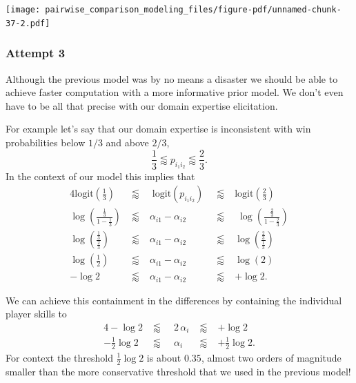 \documentclass[
  letterpaper,
  DIV=11,
  numbers=noendperiod]{scrartcl}
\begin{document}
\texttt{[image: pairwise\_comparison\_modeling\_files/figure-pdf/unnamed-chunk-37-2.pdf]}

\subsubsection{Attempt 3}\label{attempt-3}

Although the previous model was by no means a disaster we should be able
to achieve faster computation with a more informative prior model. We
don't even have to be all that precise with our domain expertise
elicitation.

For example let's say that our domain expertise is inconsistent with win
probabilities below \(1/3\) and above \(2/3\), \[
\frac{1}{3} \lessapprox p_{i_{1} i_{2}} \lessapprox \frac{2}{3}.
\] In the context of our model this implies that \begin{alignat*}{4}
\mathrm{logit} \left( \frac{1}{3} \right)
&\; \lessapprox \;&
\; \mathrm{logit} ( p_{i_{1} i_{2}} ) \;
&\; \lessapprox \;&
\mathrm{logit} \left( \frac{2}{3} \right)
\\
\log \left( \frac{ \frac{1}{3} }{1 - \frac{1}{3}} \right)
&\; \lessapprox \;&
\alpha_{i1} - \alpha_{i2}
&\; \lessapprox \;&
\; \log \left( \frac{ \frac{2}{3} }{1 - \frac{2}{3}} \right)
\\
\log \left( \frac{ \frac{1}{3} }{\frac{2}{3}} \right)
&\; \lessapprox \;&
\alpha_{i1} - \alpha_{i2}
&\; \lessapprox \;&
\log \left( \frac{ \frac{2}{3} }{\frac{1}{3}} \right)
\\
\log \left( \frac{1}{2} \right)
&\; \lessapprox \;&
\alpha_{i1} - \alpha_{i2}
&\; \lessapprox \;&
\log \left( 2 \right)
\\
- \log 2
&\; \lessapprox \;&
\alpha_{i1} - \alpha_{i2}
&\; \lessapprox \;&
+ \log 2.
\end{alignat*}

We can achieve this containment in the differences by containing the
individual player skills to \begin{alignat*}{4}
- \log 2
&\; \lessapprox \;&
\; 2 \, \alpha_{i}
&\; \lessapprox \;&
+ \log 2
\\
- \frac{1}{2} \log 2
&\; \lessapprox \;&
\; \alpha_{i}
&\; \lessapprox \;&
+ \frac{1}{2} \log 2.
\end{alignat*} For context the threshold \(\frac{1}{2} \log 2\) is about
\(0.35\), almost two orders of magnitude smaller than the more
conservative threshold that we used in the previous model!
\end{document}
